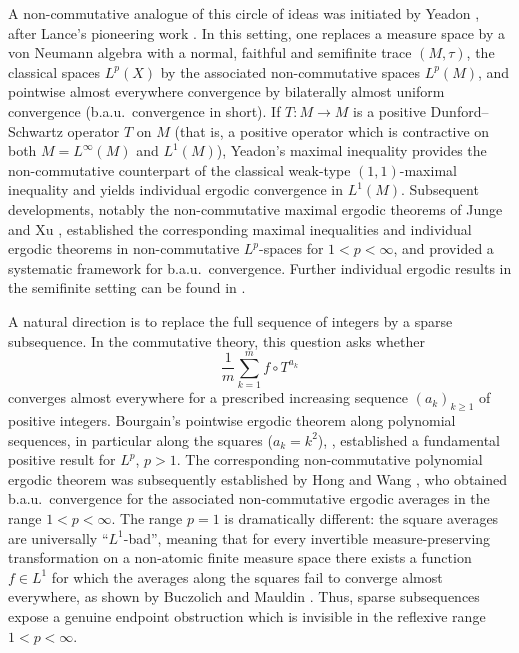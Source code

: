 \documentclass[12pt]{amsart}
\theoremstyle{remark}
\theoremstyle{definition}
\numberwithin{equation}{section}
\begin{document}
A non-commutative analogue of this circle of ideas was 
initiated by Yeadon
\cite{Ye}, after Lance's pioneering work \cite{La}. 
In this setting, one replaces a measure space by a von Neumann
algebra with a normal, faithful and semifinite trace $(M,\tau)$, the classical
spaces $L^p(X)$ by the associated non-commutative spaces $L^p(M)$, and
pointwise almost everywhere convergence by bilaterally almost uniform
convergence (b.a.u.\ convergence in short). 
If $T\colon M\to M$ is a positive Dunford--Schwartz operator $T$ on $M$ (that is, a positive operator which is
contractive on both $M=L^\infty(M)$ and $L^1(M)$),
Yeadon's maximal inequality provides the non-commutative counterpart of the
classical weak-type $(1,1)$-maximal inequality and yields individual ergodic
convergence in $L^1(M)$. Subsequent developments, notably the
non-commutative maximal ergodic theorems of Junge and Xu \cite{JX},
established the corresponding maximal inequalities and individual ergodic
theorems in non-commutative $L^p$-spaces for $1<p<\infty$, and provided a
systematic framework for b.a.u.\ convergence. Further individual ergodic results in the semifinite setting can be found in \cite{CL}.





A natural direction is to replace the full sequence of integers by a sparse
subsequence. In the commutative theory, this question asks whether
\[
   \frac{1}{m}\sum_{k=1}^m f\circ T^{a_k}
\]
converges almost everywhere for a prescribed increasing sequence
$(a_k)_{k\geq 1}$ of positive integers. Bourgain's pointwise ergodic theorem along
polynomial sequences, in particular along the squares ($a_k = k^2$), \cite{B2}, established a
fundamental positive result for $L^p$, $p>1$. The corresponding non-commutative polynomial ergodic theorem was subsequently established by Hong and Wang \cite{HW}, who obtained b.a.u.\ convergence for the associated non-commutative ergodic averages in the range \(1<p<\infty\). The range
$p=1$ is dramatically different: the square averages are universally
``$L^1$-bad'', meaning that for every invertible measure-preserving transformation on a non-atomic finite measure space there exists a function $f\in L^1$ for which the averages along the squares fail to converge
almost everywhere, as shown by Buczolich and Mauldin
\cite{BM1, BM2}. Thus, sparse subsequences expose a genuine endpoint
obstruction which is invisible in the reflexive range $1<p<\infty$.
\end{document}
